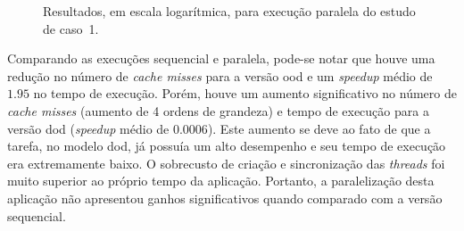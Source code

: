 \begin{figure}[ht]
    \centering
    \caption[Resultados do estudo de caso~1 com execução paralela.]{Resultados, em escala logarítmica, para execução paralela do estudo de caso~1.}
    \label{fig:problem1ExecParallel}
\end{figure}

Comparando as execuções sequencial e paralela, pode-se notar que houve uma redução no número de  \textit{cache misses} para a versão \ac{ood} e um \textit{speedup} médio de $1.95$ no tempo de execução.
Porém, houve um aumento significativo no número de  \textit{cache misses} (aumento de 4 ordens de grandeza) e tempo de execução para a versão \ac{dod} (\textit{speedup} médio de $0.0006$).
Este aumento se deve ao fato de que a tarefa, no modelo \ac{dod}, já possuía um alto desempenho e seu tempo de execução era extremamente baixo.
O sobrecusto de criação e sincronização das \textit{threads} foi muito superior ao próprio tempo da aplicação.
Portanto, a paralelização desta aplicação não apresentou ganhos significativos quando comparado com a versão sequencial.



